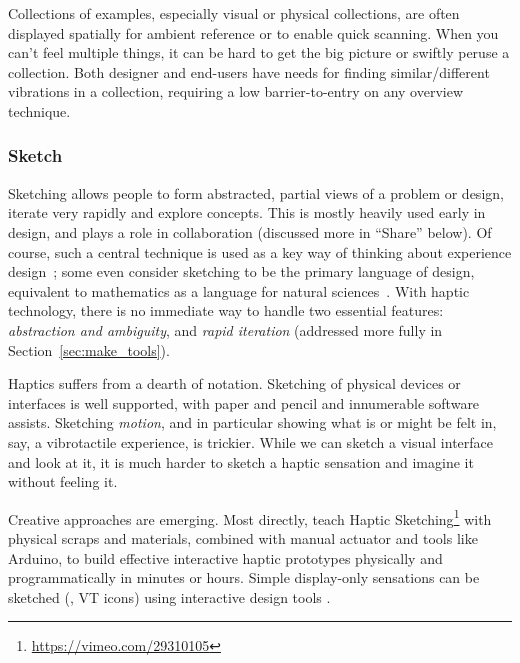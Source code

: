     Collections of examples, especially visual or physical collections, are often displayed spatially for ambient reference or to enable quick scanning.
    When you can't feel multiple things, it can be hard to get the big picture or swiftly peruse a collection.
    Both designer and end-users have needs for finding similar/different vibrations in a collection, requiring a low barrier-to-entry on any overview technique.


%
%
\subsubsection{Sketch}
\label{sec:make_DP_sketch}
Sketching allows people to form abstracted, partial views of a problem or design, iterate very rapidly and explore concepts.
This is mostly heavily used early in design, and plays a role in collaboration (discussed more in ``Share'' below).
Of course, such a central technique is used as a key way of thinking about experience design~\cite{Buxton2007}; 
some even consider sketching to be the primary language of design, equivalent to mathematics as a language for natural sciences~\cite{Cross2006}.
With haptic technology, there is no immediate way to handle two essential features: \textit{abstraction and ambiguity}, and \textit{rapid iteration} (addressed more fully in Section~\ref{sec:make_tools}).

	Haptics suffers from a dearth of notation.
	Sketching of physical devices or interfaces is well supported, with paper and pencil and innumerable software assists.
	Sketching \textit{motion}, and in particular showing what is or might be felt in, say, a vibrotactile experience, is  trickier.
	While we can sketch a visual interface and look at it, it is much harder to sketch a haptic sensation and imagine it without feeling it.

Creative approaches are emerging.
Most directly, \citet{Moussette2011} teach Haptic Sketching\footnote{\url{https://vimeo.com/29310105}} with physical scraps and materials, combined with manual actuator and tools like Arduino, to build effective interactive haptic prototypes physically and programmatically  in minutes or hours.
Simple display-only sensations can be sketched (\eg, VT icons)  using interactive design tools \cite{schneider2014improvising,Hong2013}.


